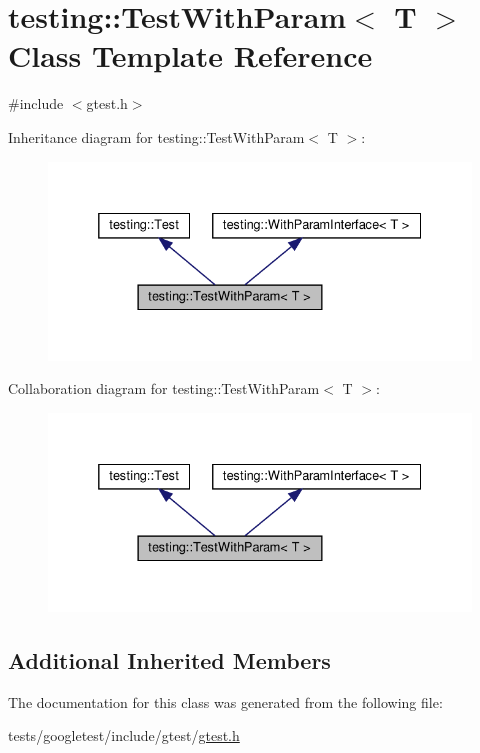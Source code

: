 \hypertarget{classtesting_1_1TestWithParam}{}\section{testing\+:\+:Test\+With\+Param$<$ T $>$ Class Template Reference}
\label{classtesting_1_1TestWithParam}


{\ttfamily \#include $<$gtest.\+h$>$}



Inheritance diagram for testing\+:\+:Test\+With\+Param$<$ T $>$\+:\nopagebreak
\begin{figure}[H]
\begin{center}
\leavevmode
\includegraphics[width=332pt]{classtesting_1_1TestWithParam__inherit__graph}
\end{center}
\end{figure}


Collaboration diagram for testing\+:\+:Test\+With\+Param$<$ T $>$\+:\nopagebreak
\begin{figure}[H]
\begin{center}
\leavevmode
\includegraphics[width=332pt]{classtesting_1_1TestWithParam__coll__graph}
\end{center}
\end{figure}
\subsection*{Additional Inherited Members}


The documentation for this class was generated from the following file\+:\begin{DoxyCompactItemize}
\item 
tests/googletest/include/gtest/\hyperlink{gtest_8h}{gtest.\+h}\end{DoxyCompactItemize}
